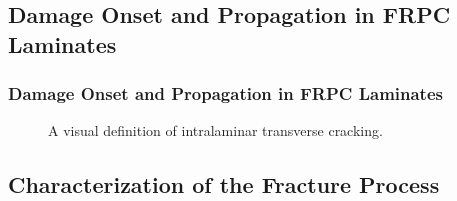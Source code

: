 \documentclass[first,firstsupp,lastsupp,last,hyperref,table]{ETHclass}
\begin{document}
\subsection[Damage in FRPC]{Damage Onset and Propagation in FRPC Laminates}

\begin{frame}
\frametitle{\small Damage Onset and Propagation in FRPC Laminates}
\vspace{-0.75cm}
\centering
\captionsetup[subfigure]{labelfont=footnotesize}
\begin{figure}[!h]
\centering
{}\quad
{}
 \caption{A visual definition of intralaminar transverse cracking.}
  \label{fig:intralaminar-cracks}
\end{figure}
\end{frame}

\subsection[Characterization of the Fracture Process]{Characterization of the Fracture Process}
\end{document}
